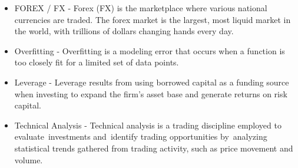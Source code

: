 \documentclass[main.tex]{subfiles}
\begin{document}
\begin{itemize}
\item FOREX / FX - Forex (FX) is the marketplace where various national currencies are traded. The forex market is the largest, most liquid market in the world, with trillions of dollars changing hands every day.
\item Overfitting - Overfitting is a modeling error that occurs when a function is too closely fit for a limited set of data points.
\item Leverage - Leverage results from using borrowed capital as a funding source when
investing to expand the firm's asset base and generate returns on risk
capital.
\item Technical Analysis - Technical analysis is a trading discipline employed to
evaluate investments and identify trading opportunities by analyzing
statistical trends gathered from trading activity, such as price
movement and volume. 
\end{itemize}
\end{document}
